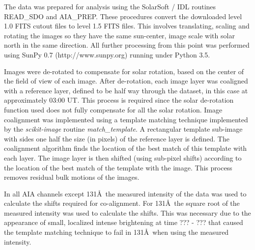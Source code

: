 \documentclass[onecolumn]{emulateapj}
\begin{document}
The data was prepared for analysis using the SolarSoft / IDL routines
READ\_SDO and AIA\_PREP.  These procedures convert the downloaded
level 1.0 FITS cutout files to level 1.5 FITS files.  This involves
translating, scaling and rotating the images so they have the same
sun-center, image scale with solar north in the same direction.  All
further processing from this point was performed using SunPy 0.7
(http://www.sunpy.org) running under Python 3.5.  

Images were de-rotated to compensate for solar rotation, based on the
center of the field of view of each image.  After de-rotation, each
image layer was coaligned with a reference layer, defined to be half
way through the dataset, in this case at approximately 03:00 UT.  This
process is required since the solar de-rotation function used does not
fully compensate for all the solar rotation. Image coalignment was
implemented using a template matching technique \citep{lewis1995fast}
implemented by the {\it scikit-image} \citep{Vanderwalt2014} routine
{\it match\_template}.  A rectangular template sub-image with sides
one half the size (in pixels) of the reference layer is defined.  The
coalignment algorithm finds the location of the best match of this
template with each layer.  The image layer is then shifted (using
sub-pixel shifts) according to the location of the best match of the
template with the image.  This process removes residual bulk motions
of the images.

In all AIA channels except 131\AA\ the measured intensity of the data
was used to calculate the shifts required for co-alignment.  For
131\AA\ the square root of the measured intensity was used to
calculate the shifts.  This was necessary due to the appearance of
small, localized intense brightening at time ??? - ??? that caused the
template matching technique to fail in 131\AA\ when using the measured
intensity.

\end{document}
